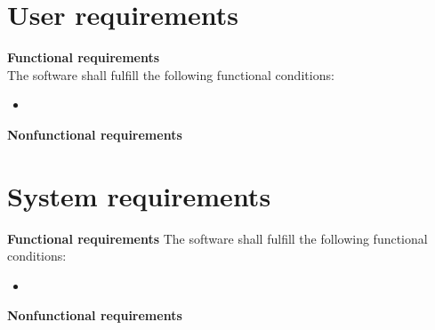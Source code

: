 \documentclass{article}
\begin{document}
\section{User requirements}
\textbf{Functional requirements} \\
The software shall fulfill the following functional conditions:
\begin{itemize}
\item 
\end{itemize}  

\textbf{Nonfunctional requirements} \\

\section{System requirements}
\textbf{Functional requirements}
The software shall fulfill the following functional conditions:
\begin{itemize}
\item 
\end{itemize}  


\textbf{Nonfunctional requirements}
\end{document}
